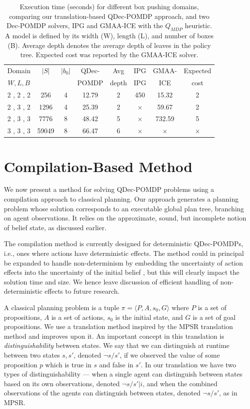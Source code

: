 \documentclass[letterpaper]{article}
\theoremstyle{definition}
\begin{document}
\begin{table}[t]
\centering
\caption{\small{Execution time (seconds) for different box pushing domains, comparing our translation-based QDec-POMDP approach, and two Dec-POMDP solvers, IPG and GMAA-ICE with the $Q_{MDP}$ heuristic.
A model is defined by its width (W), length (L), and number of boxes (B). Average depth denotes the average depth of leaves in the policy tree. Expected cost was reported by the GMAA-ICE solver.
}}
\small
\begin{tabular}{|c|c|c||c|c|c|c|c|}
\hline
Domain & $|S|$ & $|b_0|$ & QDec- & Avg & IPG & GMAA- & Expected \\
$W,L,B$ &  &  & POMDP & depth & IPG & ICE & cost \\
\hline
 2 , 2 , 2 & 256 & 4 & 12.79 & 2 & 450 & 15.32 & 2 \\
 2 , 3 , 2 & 1296 & 4 & 25.39 & 2 & $\times$ & 59.67 & 2  \\
 2 , 3 , 3 & 7776 & 8 & 48.42 & 5 & $\times$ & 732.59 & 5 \\
 3 , 3 , 3 & 59049 & 8 & 66.47 & 6 & $\times$ & $\times$ & $\times$ \\
\hline
\end{tabular}
\label{tbl:Results}
\end{table}




\section{Compilation-Based Method}

We now present a method for solving QDec-POMDP problems using a compilation approach to classical planning. Our approach generates a planning problem whose solution corresponds to an executable global plan tree, branching on agent observations. It relies on the approximate, sound, but incomplete notion of belief state, as discussed earlier.

The compilation method is currently designed for deterministic QDec-POMDPs, i.e., ones where actions have deterministic effects. The method could in principal be expanded to handle non-determinism by embedding the uncertainty of action effects into the uncertainty of the initial belief \cite{Yoon}, but this will clearly impact the solution time and size.  We hence leave discussion of efficient handling of non-deterministic effects to future research.

A classical planning problem is a tuple $\pi=\langle P,A,s_0,G\rangle$ where $P$ is a set of propositions, $A$ is a set of actions, $s_0$ is the initial state, and $G$ is a set of goal propositions. We use a translation method inspired by the MPSR translation method \cite{MPSR} and improves upon it. An important concept in this translation is {\em distinguishability} between states. We say that we can distinguish at runtime between two states $s,s'$, denoted $\neg s/s'$, if we observed the value of some proposition $p$ which is true in $s$ and false in $s'$. In our translation we have two types of distinguishability --- when a single agent can distinguish between states based on its own observations, denoted $\neg s/s'|i$, and when the combined observations of the agents can distinguish between states, denoted $\neg s/s'$, as in MPSR.
\end{document}
